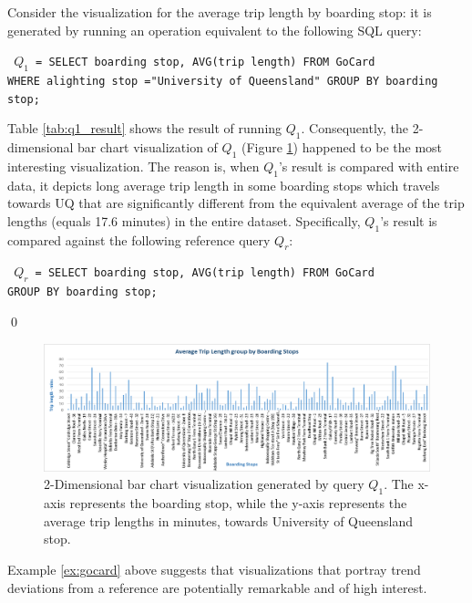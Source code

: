 \begin{example}
Consider the visualization for the average trip length by boarding stop: it is generated by running an operation equivalent to the following SQL query:
%
\begin{center} 
\texttt{ $Q_1$ = SELECT boarding stop, AVG(trip length)  FROM GoCard 
\\ WHERE alighting stop ="University of Queensland"  GROUP BY boarding stop; } 
\end{center}
%
Table \ref{tab:q1_result} shows the result of running $Q_1$.
%
Consequently, the 2-dimensional bar chart visualization of $Q_1$ (Figure \ref{fig:q1_vis}) happened to be the most interesting visualization.
%
The reason is, when $Q_1$'s result is compared with entire data, it depicts long average trip length in some boarding stops which travels towards UQ that are significantly different from the equivalent average of the trip lengths (equals 17.6 minutes) in the entire dataset.
%
Specifically, $Q_1$'s result is compared against the following reference query $Q_r$:
%
\begin{center} 
\texttt{ $Q_r$ = SELECT boarding stop, AVG(trip length)  FROM GoCard 
\\  GROUP BY boarding stop; } 
\end{center}
%
\qed
\end{example}
%
%
%
\begin{figure}[t] 
	\centering
	\includegraphics[width=\textwidth]{example.png}
 	\caption{2-Dimensional bar chart visualization generated by query $Q_1$. The x-axis represents the boarding stop, while the y-axis represents the average trip lengths in minutes, towards University of Queensland stop.}
	\label{fig:q1_vis}
\end{figure}
%
%
%
%
%
%
%
Example \ref{ex:gocard} above suggests that visualizations that portray trend deviations from a reference are potentially remarkable and of high interest.
%

